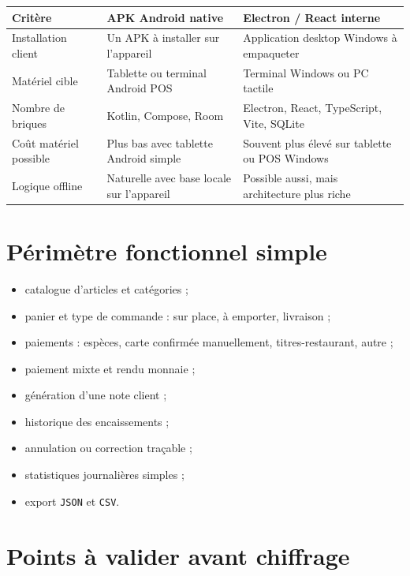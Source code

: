 \documentclass[11pt,a4paper]{article}
\begin{document}
\begin{tabularx}{\textwidth}{L{4.5cm} Y Y}
  \toprule
  \color{white}\textbf{Critère} &
  \color{white}\textbf{APK Android native} &
  \color{white}\textbf{Electron / React interne} \\
  \midrule
  Installation client &
  Un APK à installer sur l'appareil &
  Application desktop Windows à empaqueter \\
  Matériel cible &
  Tablette ou terminal Android POS &
  Terminal Windows ou PC tactile \\
  Nombre de briques &
  Kotlin, Compose, Room &
  Electron, React, TypeScript, Vite, SQLite \\
  Coût matériel possible &
  Plus bas avec tablette Android simple &
  Souvent plus élevé sur tablette ou POS Windows \\
  Logique offline &
  Naturelle avec base locale sur l'appareil &
  Possible aussi, mais architecture plus riche \\
  \bottomrule
\end{tabularx}

\section{Périmètre fonctionnel simple}

\begin{itemize}
  \item catalogue d'articles et catégories ;
  \item panier et type de commande : sur place, à emporter, livraison ;
  \item paiements : espèces, carte confirmée manuellement, titres-restaurant, autre ;
  \item paiement mixte et rendu monnaie ;
  \item génération d'une note client ;
  \item historique des encaissements ;
  \item annulation ou correction traçable ;
  \item statistiques journalières simples ;
  \item export \texttt{JSON} et \texttt{CSV}.
\end{itemize}

\section{Points à valider avant chiffrage}
\end{document}

